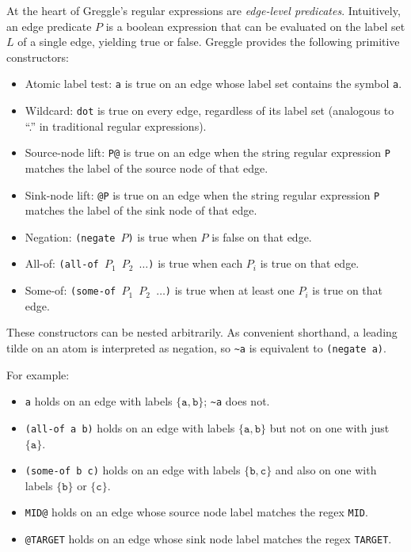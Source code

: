 \documentclass[11pt]{article}
\begin{document}
At the heart of Greggle's regular expressions are \emph{edge-level
predicates}.  Intuitively, an edge predicate $P$ is a boolean
expression that can be evaluated on the label set $L$ of a single
edge, yielding true or false.  Greggle provides the following primitive
constructors:
\begin{itemize}[leftmargin=*]
  \item Atomic label test: \texttt{a} is true on an edge whose label
        set contains the symbol \texttt{a}.
  \item Wildcard: \texttt{dot} is true on every edge, regardless of
        its label set (analogous to ``.'' in traditional regular
        expressions).
  \item Source-node lift: \texttt{P@} is true on an edge when the
        string regular expression \texttt{P} matches the label of the
        source node of that edge.
  \item Sink-node lift: \texttt{@P} is true on an edge when the
        string regular expression \texttt{P} matches the label of the
        sink node of that edge.
  \item Negation: \texttt{(negate $P$)} is true when $P$ is false on
        that edge.
  \item All-of: \texttt{(all-of $P_1$ $P_2$ $\dots$)} is true when
        each $P_i$ is true on that edge.
  \item Some-of: \texttt{(some-of $P_1$ $P_2$ $\dots$)} is true when
        at least one $P_i$ is true on that edge.
\end{itemize}
These constructors can be nested arbitrarily.  As convenient
shorthand, a leading tilde on an atom is interpreted as negation, so
\texttt{\textasciitilde a} is equivalent to \texttt{(negate a)}.

For example:
\begin{itemize}[leftmargin=*]
  \item \texttt{a} holds on an edge with labels $\{\texttt{a},\texttt{b}\}$;
        \texttt{\textasciitilde a} does not.
  \item \texttt{(all-of a b)} holds on an edge with labels
        $\{\texttt{a},\texttt{b}\}$ but not on one with just
        $\{\texttt{a}\}$.
  \item \texttt{(some-of b c)} holds on an edge with labels
        $\{\texttt{b},\texttt{c}\}$ and also on one with labels
        $\{\texttt{b}\}$ or $\{\texttt{c}\}$.
  \item \texttt{MID@} holds on an edge whose source node label
        matches the regex \texttt{MID}.
  \item \texttt{@TARGET} holds on an edge whose sink node label
        matches the regex \texttt{TARGET}.
\end{itemize}
\end{document}
